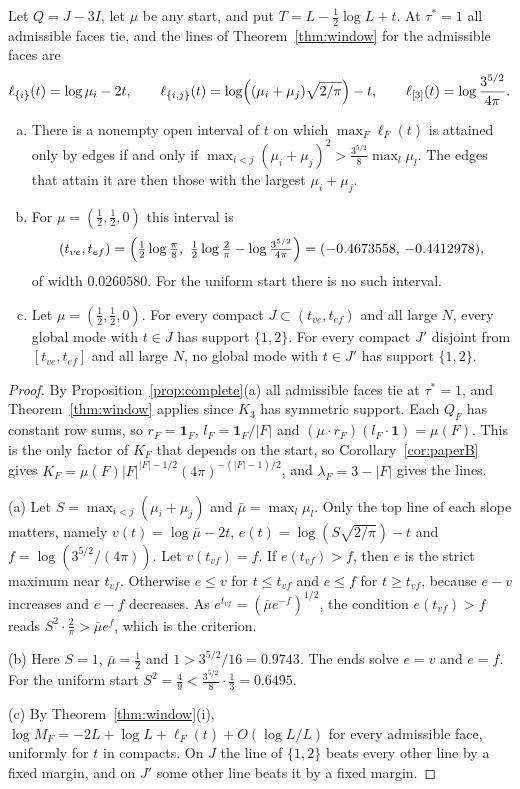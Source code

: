 \begin{proposition}\label{prop:K3start}
Let $Q=J-3I$, let $\mu$ be any start, and put $T=L-\frac12\log L+t$. At
$\tau^*=1$ all admissible faces tie, and the lines of Theorem~\ref{thm:window}
for the admissible faces are
\[
\ell_{\{i\}}(t)=\log\mu_i-2t,\qquad
\ell_{\{i,j\}}(t)=\log\Bigl((\mu_i+\mu_j)\sqrt{2/\pi}\Bigr)-t,\qquad
\ell_{[3]}(t)=\log\frac{3^{5/2}}{4\pi}.
\]
\begin{enumerate}[(a)]
\item There is a nonempty open interval of $t$ on which $\max_F\ell_F(t)$ is
attained only by edges if and only if
$\max_{i<j}(\mu_i+\mu_j)^2>\frac{3^{5/2}}8\max_l\mu_l$. The edges that attain it
are then those with the largest $\mu_i+\mu_j$.
\item For $\mu=(\frac12,\frac12,0)$ this interval is
\[
(t_{ve},t_{ef})=\Bigl(\tfrac12\log\tfrac\pi8,\
\tfrac12\log\tfrac2\pi-\log\tfrac{3^{5/2}}{4\pi}\Bigr)=(-0.4673558,\,-0.4412978),
\]
of width $0.0260580$. For the uniform start there is no such interval.
\item Let $\mu=(\frac12,\frac12,0)$. For every compact
$J\subset(t_{ve},t_{ef})$ and all large $N$, every global mode with $t\in J$ has
support $\{1,2\}$. For every compact $J'$ disjoint from $[t_{ve},t_{ef}]$ and
all large $N$, no global mode with $t\in J'$ has support $\{1,2\}$.
\end{enumerate}
\end{proposition}

\begin{proof}
By Proposition~\ref{prop:complete}(a) all admissible faces tie at $\tau^*=1$,
and Theorem~\ref{thm:window} applies since $K_3$ has symmetric support. Each
$Q_F$ has constant row sums, so $r_F=\mathbf 1_F$, $l_F=\mathbf 1_F/\lvert
F\rvert$ and $(\mu\cdot r_F)(l_F\cdot\mathbf 1)=\mu(F)$. This is the only
factor of $K_F$ that depends on the start, so Corollary~\ref{cor:paperB} gives
$K_F=\mu(F)\lvert F\rvert^{\lvert F\rvert-1/2}(4\pi)^{-(\lvert F\rvert-1)/2}$,
and $\lambda_F=3-\lvert F\rvert$ gives the lines.

(a) Let $S=\max_{i<j}(\mu_i+\mu_j)$ and $\bar\mu=\max_l\mu_l$. Only the top line
of each slope matters, namely $v(t)=\log\bar\mu-2t$,
$e(t)=\log(S\sqrt{2/\pi})-t$ and $f=\log(3^{5/2}/(4\pi))$. Let $v(t_{vf})=f$.
If $e(t_{vf})>f$, then $e$ is the strict maximum near $t_{vf}$. Otherwise $e\le
v$ for $t\le t_{vf}$ and $e\le f$ for $t\ge t_{vf}$, because $e-v$ increases
and $e-f$ decreases. As $e^{t_{vf}}=(\bar\mu e^{-f})^{1/2}$, the condition
$e(t_{vf})>f$ reads $S^2\cdot\frac2\pi>\bar\mu e^f$, which is the criterion.

(b) Here $S=1$, $\bar\mu=\frac12$ and $1>3^{5/2}/16=0.9743$. The ends solve $e=v$
and $e=f$. For the uniform start $S^2=\frac49<\frac{3^{5/2}}8\cdot\frac13=0.6495$.

(c) By Theorem~\ref{thm:window}(i), $\log M_F=-2L+\log L+\ell_F(t)+O(\log L/L)$
for every admissible face, uniformly for $t$ in compacts. On $J$ the line of
$\{1,2\}$ beats every other line by a fixed margin, and on $J'$ some other line
beats it by a fixed margin.
\end{proof}


